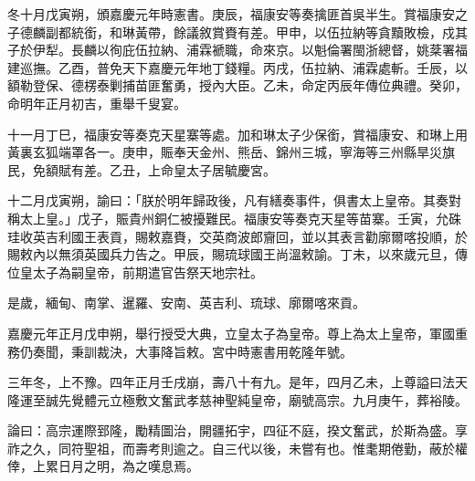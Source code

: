\begin{pinyinscope}
冬十月戊寅朔，頒嘉慶元年時憲書。庚辰，福康安等奏擒匪首吳半生。賞福康安之子德麟副都統銜，和琳黃帶，餘議敘賞賚有差。甲申，以伍拉納等貪黷敗檢，戍其子於伊犁。長麟以徇庇伍拉納、浦霖褫職，命來京。以魁倫署閩浙總督，姚棻署福建巡撫。乙酉，普免天下嘉慶元年地丁錢糧。丙戌，伍拉納、浦霖處斬。壬辰，以額勒登保、德楞泰剿捕苗匪奮勇，授內大臣。乙未，命定丙辰年傳位典禮。癸卯，命明年正月初吉，重舉千叟宴。

十一月丁巳，福康安等奏克天星寨等處。加和琳太子少保銜，賞福康安、和琳上用黃裏玄狐端罩各一。庚申，賑奉天金州、熊岳、錦州三城，寧海等三州縣旱災旗民，免額賦有差。乙丑，上命皇太子居毓慶宮。

十二月戊寅朔，諭曰：「朕於明年歸政後，凡有繕奏事件，俱書太上皇帝。其奏對稱太上皇。」戊子，賑貴州銅仁被擾難民。福康安等奏克天星等苗寨。壬寅，允硃珪收英吉利國王表貢，賜敕嘉賚，交英商波郎齎回，並以其表言勸廓爾喀投順，於賜敕內以無須英國兵力告之。甲辰，賜琉球國王尚溫敕諭。丁未，以來歲元旦，傳位皇太子為嗣皇帝，前期遣官告祭天地宗社。

是歲，緬甸、南掌、暹羅、安南、英吉利、琉球、廓爾喀來貢。

嘉慶元年正月戊申朔，舉行授受大典，立皇太子為皇帝。尊上為太上皇帝，軍國重務仍奏聞，秉訓裁決，大事降旨敕。宮中時憲書用乾隆年號。

三年冬，上不豫。四年正月壬戌崩，壽八十有九。是年，四月乙未，上尊謚曰法天隆運至誠先覺體元立極敷文奮武孝慈神聖純皇帝，廟號高宗。九月庚午，葬裕陵。

論曰：高宗運際郅隆，勵精圖治，開疆拓宇，四征不庭，揆文奮武，於斯為盛。享祚之久，同符聖祖，而壽考則逾之。自三代以後，未嘗有也。惟耄期倦勤，蔽於權倖，上累日月之明，為之嘆息焉。


\end{pinyinscope}